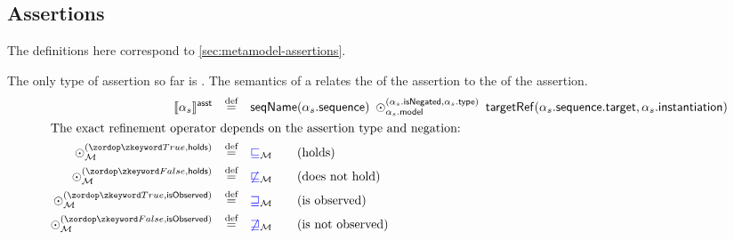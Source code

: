 \subsection{Assertions}

The definitions here correspond to \cref{sec:metamodel-assertions}.

\begin{defn}[\massertion]

\newcommand{\refop}[3]{\mathbin{\odot_{#1}^{(#2, #3)}}}

The only type of assertion so far is \msequenceassertion.  The semantics of a
\msequenceassertion{} relates the \msequence{} of the assertion to the
\mtarget{} of the assertion.
%
\begin{align*}
	\asstsema{\asasst}
\quad\defeq\quad&
	\seqnameOf{\field{\asasst}{sequence}}
	\;
	\refop{\field{\asasst}{model}}{\field{\asasst}{isNegated}}{\field{\asasst}{type}}
	\;
	\targetRef{\field{\field{\asasst}{sequence}}{target}}{\field{\asasst}{instantiation}}
\\
\intertext{The exact refinement operator depends on the assertion type and
negation:}
	\refop{\amodel}{\true}{\mathsf{holds}}
\quad\defeq\quad&
	\tlang{\sqsubseteq}_\amodel
\tag{holds}
\\
	\refop{\amodel}{\false}{\mathsf{holds}}
\quad\defeq\quad&
	\tlang{\not\sqsubseteq}_\amodel
\tag{does not hold}
\\
	\refop{\amodel}{\true}{\mathsf{isObserved}}
\quad\defeq\quad&
	\tlang{\sqsupseteq}_\amodel
\tag{is observed}
\\
	\refop{\amodel}{\false}{\mathsf{isObserved}}
\quad\defeq\quad&
	\tlang{\not\sqsupseteq}_\amodel
\tag{is not observed}
\\
\end{align*}
\end{defn}